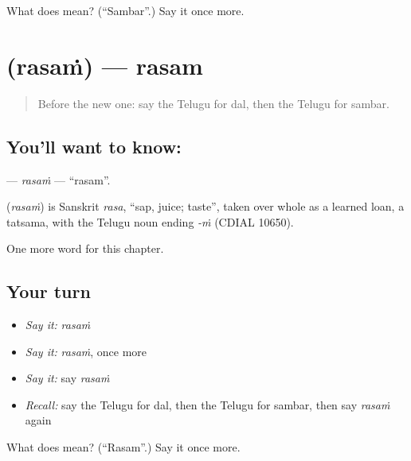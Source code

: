 \begin{tcolorbox}[breakable,colback=teal!4,colframe=teal!35!black,title={Before you move on}]
What does  mean? (\textquotedblleft{}Sambar\textquotedblright{}.) Say it once more.
\end{tcolorbox}
\section[\texorpdfstring{\te{రసం} (rasaṁ)}{రసం (rasaṁ)}]{ (rasaṁ) — rasam}

\label{lesson:TE-C116-rasam}



\begin{quote}
Before the new one: say the Telugu for dal, then the Telugu for sambar.
\end{quote}

\subsection*{You'll want to know: }
\textbf{} — \emph{rasaṁ} — \textquotedblleft{}rasam\textquotedblright{}.

\begin{cousinweb}
\textbf{} (\emph{rasaṁ}) is Sanskrit \emph{rasa}, \textquotedblleft{}sap, juice; taste\textquotedblright{}, taken over whole as a learned loan, a tatsama, with the Telugu noun ending \emph{-ṁ} (CDIAL 10650).
\end{cousinweb}

\begin{grammarlens}[title={What you've built}]
One more word for this chapter.
\end{grammarlens}

\subsection*{Your turn}
\begin{itemize}
\raggedright
  \item \emph{Say it:} \emph{rasaṁ}
  \item \emph{Say it:} \emph{rasaṁ}, once more
  \item \emph{Say it:} say \emph{rasaṁ}
  \item \emph{Recall:} say the Telugu for dal, then the Telugu for sambar, then say \emph{rasaṁ} again
\end{itemize}

\begin{tcolorbox}[breakable,colback=teal!4,colframe=teal!35!black,title={Before you move on}]
What does  mean? (\textquotedblleft{}Rasam\textquotedblright{}.) Say it once more.
\end{tcolorbox}
